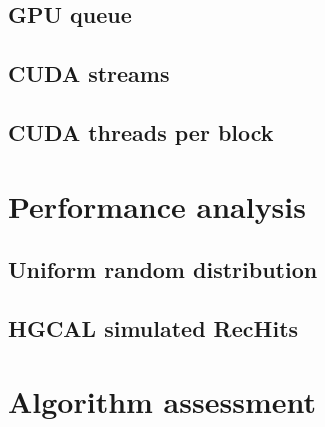 \subsection{GPU queue}

\subsection{CUDA streams}

\subsection{CUDA threads per block}

\section{Performance analysis}

\subsection{Uniform random distribution}

\subsection{HGCAL simulated RecHits}

\section{Algorithm assessment}